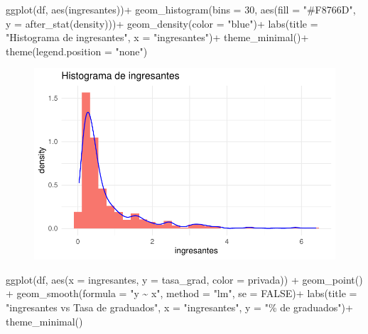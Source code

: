 \documentclass[
  letterpaper,
  DIV=11,
  numbers=noendperiod]{scrartcl}
\newenvironment{Shaded}{\begin{snugshade}}{\end{snugshade}}
\newcommand{\AttributeTok}[1]{\textcolor[rgb]{0.40,0.45,0.13}{#1}}
\newcommand{\ConstantTok}[1]{\textcolor[rgb]{0.56,0.35,0.01}{#1}}
\newcommand{\DecValTok}[1]{\textcolor[rgb]{0.68,0.00,0.00}{#1}}
\newcommand{\FunctionTok}[1]{\textcolor[rgb]{0.28,0.35,0.67}{#1}}
\newcommand{\NormalTok}[1]{\textcolor[rgb]{0.00,0.23,0.31}{#1}}
\newcommand{\SpecialCharTok}[1]{\textcolor[rgb]{0.37,0.37,0.37}{#1}}
\newcommand{\StringTok}[1]{\textcolor[rgb]{0.13,0.47,0.30}{#1}}
\begin{document}
\begin{Shaded}
\begin{Highlighting}[]
\FunctionTok{ggplot}\NormalTok{(df, }\FunctionTok{aes}\NormalTok{(ingresantes))}\SpecialCharTok{+}
  \FunctionTok{geom\_histogram}\NormalTok{(}\AttributeTok{bins =} \DecValTok{30}\NormalTok{, }\FunctionTok{aes}\NormalTok{(}\AttributeTok{fill =} \StringTok{"\#F8766D"}\NormalTok{, }\AttributeTok{y =} \FunctionTok{after\_stat}\NormalTok{(density)))}\SpecialCharTok{+}
  \FunctionTok{geom\_density}\NormalTok{(}\AttributeTok{color =} \StringTok{"blue"}\NormalTok{)}\SpecialCharTok{+}
  \FunctionTok{labs}\NormalTok{(}\AttributeTok{title =} \StringTok{"Histograma de ingresantes"}\NormalTok{,}
       \AttributeTok{x =} \StringTok{"ingresantes"}\NormalTok{)}\SpecialCharTok{+}
  \FunctionTok{theme\_minimal}\NormalTok{()}\SpecialCharTok{+}
  \FunctionTok{theme}\NormalTok{(}\AttributeTok{legend.position =} \StringTok{"none"}\NormalTok{)}
\end{Highlighting}
\end{Shaded}

\begin{figure}[H]

{\centering \includegraphics{TP_final_files/figure-pdf/unnamed-chunk-11-1.pdf}

}

\end{figure}

\begin{Shaded}
\begin{Highlighting}[]
\FunctionTok{ggplot}\NormalTok{(df, }\FunctionTok{aes}\NormalTok{(}\AttributeTok{x =}\NormalTok{ ingresantes, }\AttributeTok{y =}\NormalTok{ tasa\_grad, }\AttributeTok{color =}\NormalTok{ privada)) }\SpecialCharTok{+}
  \FunctionTok{geom\_point}\NormalTok{() }\SpecialCharTok{+} 
  \FunctionTok{geom\_smooth}\NormalTok{(}\AttributeTok{formula =} \StringTok{"y \textasciitilde{} x"}\NormalTok{, }\AttributeTok{method =} \StringTok{"lm"}\NormalTok{, }\AttributeTok{se =} \ConstantTok{FALSE}\NormalTok{)}\SpecialCharTok{+}
  \FunctionTok{labs}\NormalTok{(}\AttributeTok{title =} \StringTok{"ingresantes vs Tasa de graduados"}\NormalTok{,}
       \AttributeTok{x =} \StringTok{"ingresantes"}\NormalTok{,}
       \AttributeTok{y =} \StringTok{"\% de graduados"}\NormalTok{)}\SpecialCharTok{+}
  \FunctionTok{theme\_minimal}\NormalTok{()}
\end{Highlighting}
\end{Shaded}
\end{document}
